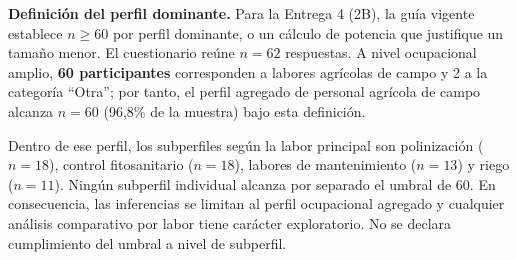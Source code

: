 \documentclass[11pt,a4paper]{article}
\begin{document}
\textbf{Definición del perfil dominante.} Para la Entrega 4 (2B), la guía vigente establece
$n \geq 60$ por perfil dominante, o un cálculo de potencia que justifique un tamaño menor.
El cuestionario reúne $n = 62$ respuestas. A nivel ocupacional amplio,
\textbf{60 participantes} corresponden a labores agrícolas de campo y 2 a la categoría
``Otra''; por tanto, el perfil agregado de personal agrícola de campo alcanza
$n = 60$ (96{,}8\% de la muestra) bajo esta definición.

Dentro de ese perfil, los subperfiles según la labor principal son polinización
($n = 18$), control fitosanitario ($n = 18$), labores de mantenimiento
($n = 13$) y riego ($n = 11$). Ningún subperfil individual alcanza por separado
el umbral de 60. En consecuencia, las inferencias se limitan al perfil ocupacional
agregado y cualquier análisis comparativo por labor tiene carácter exploratorio.
No se declara cumplimiento del umbral a nivel de subperfil.
\end{document}
